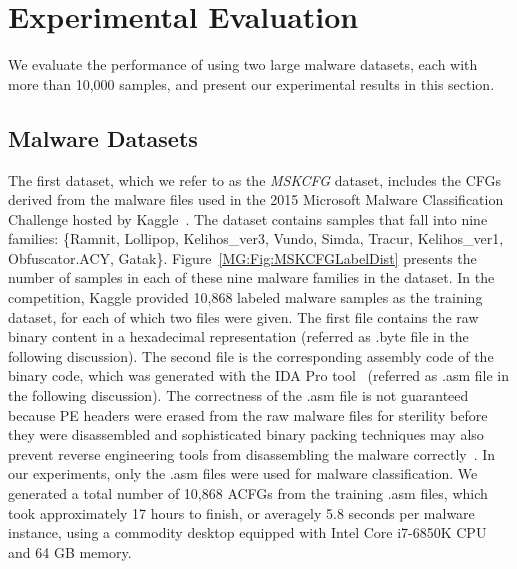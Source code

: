 \section{Experimental Evaluation}
\label{MG:Sec:Experiment}

We evaluate the performance of \sysname using two large malware datasets, each with more than 10,000 samples, and present our experimental results in this section.

\subsection{Malware Datasets}
The first dataset, which we refer to as the \textit{MSKCFG} dataset, includes the CFGs derived from the malware files used in the 2015 Microsoft Malware Classification Challenge hosted by Kaggle~\cite{MsAcfgDataset}. The dataset contains samples that fall into nine families: \{Ramnit, Lollipop, Kelihos\_ver3, Vundo, Simda, Tracur, Kelihos\_ver1, Obfuscator.ACY, Gatak\}.
Figure~\ref{MG:Fig:MSKCFGLabelDist} presents the number of samples in each of these nine malware families in the dataset.
In the competition, Kaggle provided 10,868 labeled malware samples as the training dataset, for each of which two files were given.
The first file contains the raw binary content in a hexadecimal representation (referred as .byte file in the following discussion).
The second file is the corresponding assembly code of the binary code, which was generated with the IDA Pro tool~\cite{bib:idapro} (referred as .asm file in the following discussion).
The correctness of the .asm file is not guaranteed because PE headers were erased from the raw malware files for sterility before they were disassembled and sophisticated binary packing techniques may also prevent reverse engineering tools from disassembling the malware correctly~\cite{BinaryUnpacking}. 
In our experiments, only the .asm files were used for malware classification.
We generated a total number of 10,868 ACFGs from the training .asm files, which took approximately 17 hours to finish, or averagely 5.8 seconds per malware instance,
using a commodity desktop equipped with Intel Core i7-6850K CPU and 64 GB memory.

